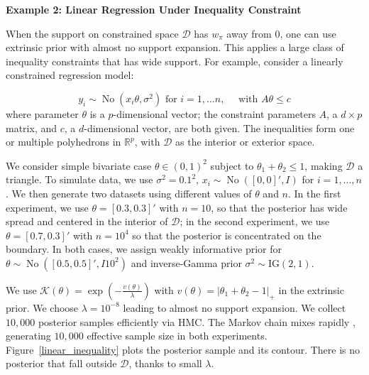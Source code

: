\documentclass[10pt]{article}
\newcommand{\mc}[1]{\mathcal{#1}}
\DeclareMathOperator{\No}{No}
\DeclareMathOperator{\1}{\mathbbm{1}}
\begin{document}
{\bf Example 2: Linear Regression Under Inequality Constraint}

When the support on constrained space $\mc D$ has $w_\pi$ away from $0$, one can use extrinsic prior with almost no support expansion. This applies a large class of inequality constraints that has wide support. For example, consider a linearly constrained regression model:

$$y_i \sim \No (x_i \theta, \sigma^2) \text{ for } i=1,\ldots n, \quad\text{ with } A\theta \le c$$
where parameter $\theta$ is a $p$-dimensional vector; the constraint parameters $A$, a $d\times p$ matrix, and $c$, a $d$-dimensional vector, are both given. The inequalities form one or multiple polyhedrons in $\mathbb R^p$, with $\mc D$ as the interior or exterior space.

We consider simple bivariate case $\theta \in (0,1)^2$ subject to $\theta_1+\theta_2\le 1$, making $\mc D$ a triangle. To simulate data, we use $\sigma^2=0.1^2$, $x_i\sim \No([0,0]',I)$ for $i=1,\ldots,n$. We then generate two datasets using different values of $\theta$ and $n$. In the first experiment, we use $\theta=[0.3,0.3]'$ with $n=10$, so that the posterior has wide spread and centered in the interior of $\mc D$; in the second experiment, we use $\theta=[0.7,0.3]'$ with $n=10^4$ so that the posterior is concentrated on the boundary. In both cases, we assign weakly informative prior for $\theta\sim \No([0.5, 0.5]',I10^2)$ and inverse-Gamma prior $\sigma^2\sim \text{IG}(2,1)$.

We use $\mc K(\theta)=\exp( - \frac{v(\theta)}{\lambda})$ with $v(\theta)=|\theta_1+\theta_2-1|_{+}$ in the extrinsic prior. We choose $\lambda=10^{-8}$ leading to almost no support expansion. We collect $10,000$ posterior samples efficiently via HMC. The Markov chain mixes rapidly , generating $10,000$ effective sample size in both experiments. Figure~\ref{linear_inequality} plots the posterior sample and its contour. There is no posterior that fall outside $\mc D$, thanks to small $\lambda$.
\end{document}
